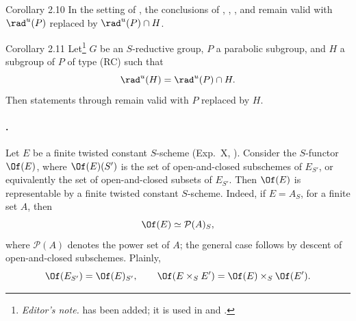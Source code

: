 \begin{sgastatement}{Corollary 2.10}
In the setting of , the conclusions of , , , and  remain
valid with \(\rad^u(P)\) replaced by \(\rad^u(P)\cap H\).
\end{sgastatement}

\begin{sgastatement}{Corollary 2.11}
Let\footnote{\emph{Editor's note.}  has been added; it is
used in  and .} \(G\) be an \(S\)-reductive group, \(P\) a parabolic subgroup, and
\(H\) a subgroup of \(P\) of type \textup{(RC)} such that
\[
 \rad^u(H)=\rad^u(P)\cap H.
\]
Then statements  through  remain valid with \(P\) replaced by
\(H\).
\end{sgastatement}



\paragraph{.}
Let \(E\) be a finite twisted constant \(S\)-scheme (Exp.\ X, ).
Consider the \(S\)-functor \(\Of(E)\), where \(\Of(E)(S')\) is the set of
open-and-closed subschemes of \(E_{S'}\), or equivalently the set of
open-and-closed subsets of \(E_{S'}\).  Then \(\Of(E)\) is representable
by a finite twisted constant \(S\)-scheme.  Indeed, if \(E=A_S\), for a
finite set \(A\), then
\[
 \Of(E)\simeq\mathcal P(A)_S,
\]
where \(\mathcal P(A)\) denotes the power set of \(A\); the general case
follows by descent of open-and-closed subschemes.  Plainly,
\[
 \Of(E_{S'})=\Of(E)_{S'},
 \qquad
 \Of(E\times_SE')=\Of(E)\times_S\Of(E').
\]

